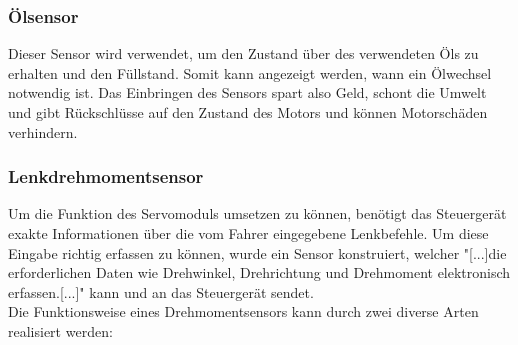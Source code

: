 	\subsubsection{Ölsensor}
	\begin{flushleft}
		
		Dieser Sensor wird verwendet, um den Zustand über des verwendeten Öls zu erhalten und den Füllstand. Somit kann angezeigt werden, wann ein Ölwechsel notwendig ist. Das Einbringen des Sensors spart also Geld, schont die Umwelt und gibt Rückschlüsse auf den Zustand des Motors und können Motorschäden verhindern.\cite{TS_oel}
		
	\end{flushleft}		
	
	\subsubsection{Lenkdrehmomentsensor}
	Um die Funktion des Servomoduls umsetzen zu können, benötigt das Steuergerät exakte Informationen über die vom Fahrer eingegebene Lenkbefehle. Um diese Eingabe richtig erfassen zu können, wurde ein Sensor konstruiert, welcher "[...]die erforderlichen Daten wie Drehwinkel, Drehrichtung und Drehmoment elektronisch erfassen.[...]"\cite{TS_dreh} kann und an das Steuergerät sendet.\\
	Die Funktionsweise eines Drehmomentsensors kann durch zwei diverse Arten realisiert werden:\\
	
